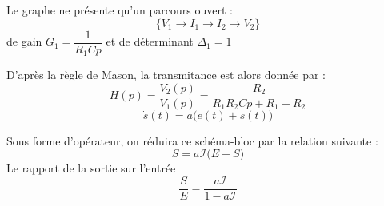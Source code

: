 Le graphe ne présente qu'un parcours ouvert :
\[
    \{V_1\rightarrow I_1\rightarrow I_2\rightarrow V_2\}
\]
de gain $G_1=\dfrac{1}{R_1Cp}$ et de déterminant $\Delta_1=1$

D'après la règle de Mason, la transmitance est alors donnée par :
\[
    H(p)=\dfrac{V_2(p)}{V_1(p)}=\dfrac{R_2}{R_1R_2Cp+ R_1+R_2}
\]
\clearpage
\[
    \dot{s}(t)=a\big(e(t)+s(t)\big)
\]
\begin{center}
    
\end{center}
Sous forme d'opérateur, on réduira ce schéma-bloc par 
la relation suivante :
\[
    S=a\mathcal{I}\big(E+S\big)
\]
Le rapport de la sortie sur l'entrée
\[
    \dfrac{S}{E}=\dfrac{a\mathcal{I}}{1-a\mathcal{I}}
\]
